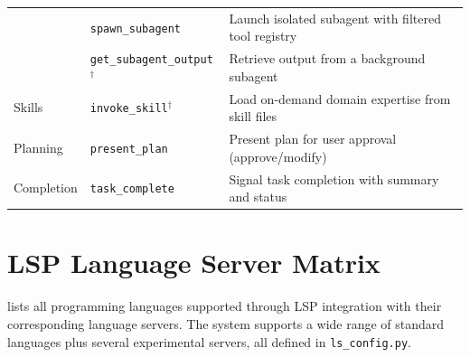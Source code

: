 \begin{table}[h]
\begin{tabular}{@{}llp{4.8cm}@{}}
& \texttt{spawn\_subagent} & Launch isolated subagent with filtered tool registry \\
& \texttt{get\_subagent\_output}$^\dagger$ & Retrieve output from a background subagent \\
\addlinespace
Skills & \texttt{invoke\_skill}$^\dagger$ & Load on-demand domain expertise from skill files \\
\addlinespace
Planning & \texttt{present\_plan} & Present plan for user approval (approve/modify) \\
\addlinespace
Completion & \texttt{task\_complete} & Signal task completion with summary and status \\
\bottomrule
\end{tabular}
\end{table}

\section{LSP Language Server Matrix}
\label{app:lsp}

 lists all programming languages supported through LSP integration with their corresponding language servers. The system supports a wide range of standard languages plus several experimental servers, all defined in \texttt{ls\_config.py}.

